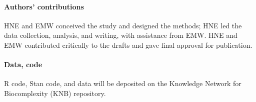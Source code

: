 \documentclass[11pt]{article}\usepackage[]{graphicx}\usepackage[]{color}
\begin{document}
\paragraph{Authors' contributions} HNE and EMW conceived the study and designed the methods; HNE led the data collection, analysis, and writing, with assistance from EMW. HNE and EMW contributed critically to the drafts and gave final approval for publication.

\paragraph{Data, code} 
R code, Stan code, and data will be deposited on the Knowledge Network for Biocomplexity (KNB) repository. 
\printbibliography 
\end{document}
